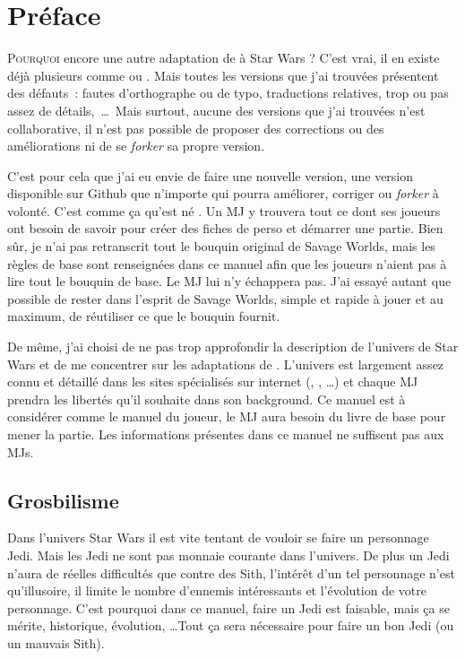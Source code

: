 \onecolumn
\section{Préface}

\lettrine{P}{ourquoi} encore une autre adaptation de  à {\jedifont Star Wars} ? C’est vrai, il en existe déjà plusieurs comme  ou . Mais toutes les versions que j’ai trouvées présentent des défauts~: fautes d’orthographe ou de typo, traductions relatives, trop ou pas assez de détails,~\ldots~Mais surtout, aucune des versions que j’ai trouvées n’est collaborative, il n’est pas possible de proposer des corrections ou des améliorations ni de se \emph{forker} sa propre version.

C’est pour cela que j’ai eu envie de faire une nouvelle version, une version disponible sur Github que n’importe qui pourra améliorer, corriger ou \emph{forker} à volonté. C’est comme ça qu’est né {\jedifont \doctitle}. Un \ac{MJ} y trouvera tout ce dont ses joueurs ont besoin de savoir pour créer des fiches de perso et démarrer une partie. Bien sûr, je n’ai pas retranscrit tout le bouquin original de Savage Worlds, mais les règles de base sont renseignées dans ce manuel afin que les joueurs n’aient pas à lire tout le bouquin de base. Le \ac{MJ} lui n’y échappera pas. J’ai essayé autant que possible de rester dans l’esprit de Savage Worlds, simple et rapide à jouer et au maximum, de réutiliser ce que le bouquin fournit.

De même, j’ai choisi de ne pas trop approfondir la description de l’univers de Star Wars et de me concentrer sur les adaptations de . L’univers est largement assez connu et détaillé dans les sites spécialisés sur internet (, , \ldots) et chaque \ac{MJ} prendra les libertés qu’il souhaite dans son background. Ce manuel est à considérer comme le manuel du joueur, le \ac{MJ} aura besoin du livre de base  pour mener la partie. Les informations présentes dans ce manuel ne suffisent pas aux \acp{MJ}.

\subsection{Grosbilisme}
Dans l’univers Star Wars il est vite tentant de vouloir se faire un personnage Jedi. Mais les Jedi ne sont pas monnaie courante dans l’univers. De plus un Jedi n’aura de réelles difficultés que contre des Sith, l’intérêt d’un tel personnage n’est qu’illusoire, il limite le nombre d’ennemis intéressants et l’évolution de votre personnage. C’est pourquoi dans ce manuel, faire un Jedi est faisable, mais ça se mérite, historique, évolution, \ldots Tout ça sera nécessaire pour faire un bon Jedi (ou un mauvais Sith).

